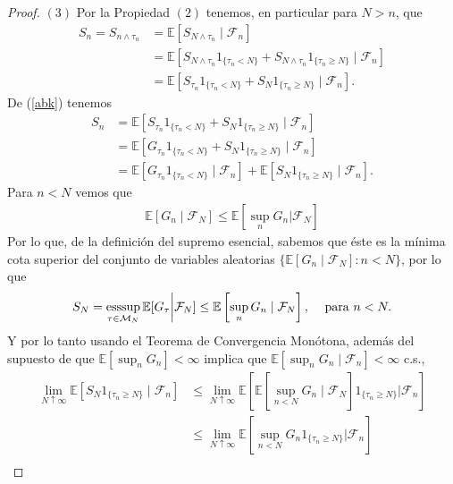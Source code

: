 \begin{proof}
\noindent $(3)$ Por la Propiedad $(2)$ tenemos, en particular para $N > n$, que
	\begin{align*}
	S_n = S_{n \wedge \tau_n} & = \mathbb{E}[S_{N \wedge \tau_n} \mid \mathcal{F}_n] \\
	& = \mathbb{E}[S_{N \wedge \tau_n} 1_{\{\tau_n < N\}} + S_{N \wedge \tau_n} 1_{\{\tau_n \geq N\}} \mid \mathcal{F}_n] \\
	& = \mathbb{E}[S_{\tau_n} 1_{\{\tau_n < N\}} + S_N 1_{\{\tau_n \geq N\}} \mid \mathcal{F}_n].
	\end{align*}
De (\ref{abk}) tenemos 
	\begin{align}
	S_n & = \mathbb{E}[S_{\tau_n} 1_{\{\tau_n < N\}} + S_N 1_{\{\tau_n \geq N\}} \mid \mathcal{F}_n] \nonumber \\
	& = \mathbb{E}[G_{\tau_n} 1_{\{\tau_n < N\}} + S_N 1_{\{\tau_n \geq N\}} \mid \mathcal{F}_n] \nonumber \\ 
	& = \mathbb{E}[G_{\tau_n} 1_{\{\tau_n < N\}} \mid \mathcal{F}_n] + \mathbb{E}[S_N 1_{\{\tau_n \geq N\}} \mid \mathcal{F}_n]. \label{abl}
	\end{align}
Para $n < N$ vemos que
	\begin{align*}
	\mathbb{E}[G_n \mid \mathcal{F}_N] \leq \mathbb{E} \left[ \sup_n G_n \bigg | \mathcal{F}_N \right]
	\end{align*}
Por lo que, de la definición del supremo esencial, sabemos que éste es la mínima cota superior del conjunto de variables aleatorias $\{\mathbb{E}[G_n \mid \mathcal{F}_N] : n < N\}$, por lo que
	\begin{align*}
	S_N = \operatorname*{esssup}_{\tau \in \mathcal{M}_N} \mathbb{E}[G_\tau \bigg | \mathcal{F}_N] \leq \mathbb{E}\left[\sup_n G_n \mid \mathcal{F}_N \right], \hspace{0.3cm} \text{ para } n < N.
	\end{align*}
Y por lo tanto usando el Teorema de Convergencia Monótona, además del supuesto de que $\mathbb{E}[\sup_n G_n] < \infty$ implica que $\mathbb{E}[\sup_n G_n \mid \mathcal{F}_n] < \infty$ c.s., 
	\begin{align}
	\lim_{N \uparrow \infty} \mathbb{E}[S_N 1_{\{\tau_n \geq N\}} \mid \mathcal{F}_n] & \leq \lim_{N \uparrow \infty} \mathbb{E} \left[ \mathbb{E} \left[ \sup_{n < N} G_n  \mid \mathcal{F}_N \right] 1_{\{\tau_n \geq N\}} \bigg | \mathcal{F}_n \right] \nonumber \\
	& \leq \lim_{N \uparrow \infty} \mathbb{E}\left[\sup_{n < N} G_n 1_{\{\tau_n \geq N\}} \bigg | \mathcal{F}_n\right] \\

\end{align}
\end{proof}
